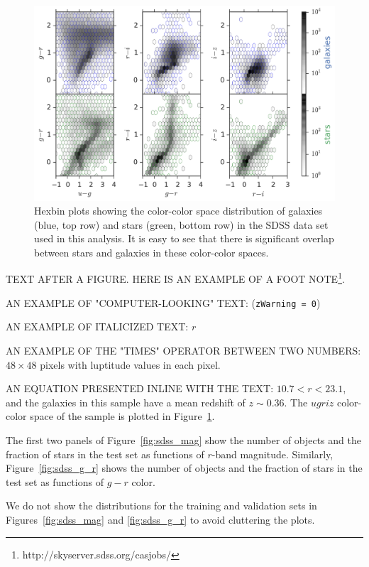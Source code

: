\documentclass[fleqn,usenatbib]{mnras}
\begin{document}
\begin{figure}
  \centering
  \includegraphics[width=\columnwidth]{figures/sdss_color_color.pdf}
  \caption{
    Hexbin plots showing the color-color space distribution of galaxies (blue, top row) and stars (green, bottom row)
    in the SDSS data set used in this analysis.
    It is easy to see that there is significant overlap between stars
    and galaxies in these color-color spaces. 
  }
  \label{fig:sdss_color_color}
\end{figure}

TEXT AFTER A FIGURE. HERE IS AN EXAMPLE OF A FOOT NOTE\footnote{http://skyserver.sdss.org/casjobs/}.

AN EXAMPLE OF "COMPUTER-LOOKING" TEXT: (\texttt{zWarning = 0})

AN EXAMPLE OF ITALICIZED TEXT: $r$ 

AN EXAMPLE OF THE "TIMES" OPERATOR BETWEEN TWO NUMBERS: $48\times48$ pixels
with luptitude values in each pixel.

AN EQUATION PRESENTED INLINE WITH THE TEXT: $10.7 < r < 23.1$,
and the galaxies in this sample have a mean redshift of $z \sim 0.36$.
The $ugriz$ color-color space of the sample is plotted in
Figure~\ref{fig:sdss_color_color}.

The first two panels of Figure~\ref{fig:sdss_mag} show the number of objects
and the fraction of stars in the test set as functions of $r$-band magnitude.
Similarly, Figure~\ref{fig:sdss_g_r} shows the number of objects and the
fraction of stars in the test set as functions of $g-r$ color.

We do not show the distributions for the training and validation sets in
Figures~\ref{fig:sdss_mag} and \ref{fig:sdss_g_r} to avoid cluttering the
plots.
\end{document}
